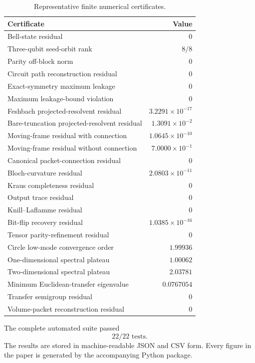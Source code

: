 \documentclass[11pt]{article}
\theoremstyle{definition}
\theoremstyle{remark}
\begin{document}
\begin{table}[htbp]
\centering
\caption{Representative finite numerical certificates.}
\label{tab:certificates}
\begin{tabular}{L{0.64\textwidth}r}
\toprule
Certificate & Value\\
\midrule
Bell-state residual & $0$\\
Three-qubit seed-orbit rank & $8/8$\\
Parity off-block norm & $0$\\
Circuit path reconstruction residual & $0$\\
Exact-symmetry maximum leakage & $0$\\
Maximum leakage-bound violation & $0$\\
Feshbach projected-resolvent residual & $3.2291\times10^{-17}$\\
Bare-truncation projected-resolvent residual & $1.3091\times10^{-2}$\\
Moving-frame residual with connection & $1.0645\times10^{-10}$\\
Moving-frame residual without connection & $7.0000\times10^{-1}$\\
Canonical packet-connection residual & $0$\\
Bloch-curvature residual & $2.0803\times10^{-11}$\\
Kraus completeness residual & $0$\\
Output trace residual & $0$\\
Knill--Laflamme residual & $0$\\
Bit-flip recovery residual & $1.0385\times10^{-16}$\\
Tensor parity-refinement residual & $0$\\
Circle low-mode convergence order & $1.99936$\\
One-dimensional spectral plateau & $1.00062$\\
Two-dimensional spectral plateau & $2.03781$\\
Minimum Euclidean-transfer eigenvalue & $0.0767054$\\
Transfer semigroup residual & $0$\\
Volume-packet reconstruction residual & $0$\\
\bottomrule
\end{tabular}
\end{table}

The complete automated suite passed
\[
\boxed{22/22\text{ tests}.}
\]
The results are stored in machine-readable JSON and CSV form. Every figure in the paper is generated by the accompanying Python package.
\end{document}
